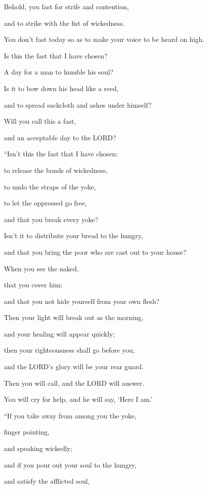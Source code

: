 \myverse{}Behold, you fast for strife and contention,

and to strike with the fist of wickedness.

You don’t fast today so as to make your voice to be heard on high.

\myverse{}Is this the fast that I have chosen?

A day for a man to humble his soul?

Is it to bow down his head like a reed,

and to spread sackcloth and ashes under himself?

Will you call this a fast,

and an acceptable day to the LORD?


\vspace{\baselineskip} \myverse{}“Isn’t this the fast that I have chosen:

to release the bonds of wickedness,

to undo the straps of the yoke,

to let the oppressed go free,

and that you break every yoke?

\myverse{}Isn’t it to distribute your bread to the hungry,

and that you bring the poor who are cast out to your house?

When you see the naked,

that you cover him;

and that you not hide yourself from your own flesh?

\myverse{}Then your light will break out as the morning,

and your healing will appear quickly;

then your righteousness shall go before you,

and the LORD’s glory will be your rear guard.

\myverse{}Then you will call, and the LORD will answer.

You will cry for help, and he will say, ‘Here I am.’

\vspace{\baselineskip} 
“If you take away from among you the yoke,

finger pointing,

and speaking wickedly;

\myverse{}and if you pour out your soul to the hungry,

and satisfy the afflicted soul,

